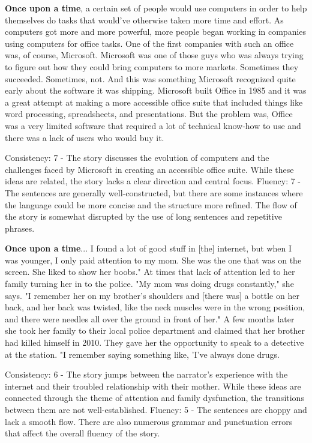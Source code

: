 \documentclass{article}
\begin{document}
\textbf{Once upon a time}, a certain set of people would use computers in order to help themselves do tasks that would've otherwise taken more time and effort. As computers got more and more powerful, more people began working in companies using computers for office tasks. One of the first companies with such an office was, of course, Microsoft. Microsoft was one of those guys who was always trying to figure out how they could bring computers to more markets. Sometimes they succeeded. Sometimes, not. And this was something Microsoft recognized quite early about the software it was shipping. Microsoft built Office in 1985 and it was a great attempt at making a more accessible office suite that included things like word processing, spreadsheets, and presentations. But the problem was, Office was a very limited software that required a lot of technical know-how to use and there was a lack of users who would buy it.

Consistency: 7 - The story discusses the evolution of computers and the challenges faced by Microsoft in creating an accessible office suite. While these ideas are related, the story lacks a clear direction and central focus.
Fluency: 7 - The sentences are generally well-constructed, but there are some instances where the language could be more concise and the structure more refined. The flow of the story is somewhat disrupted by the use of long sentences and repetitive phrases.

\textbf{Once upon a time}... I found a lot of good stuff in [the] internet, but when I was younger, I only paid attention to my mom. She was the one that was on the screen. She liked to show her boobs." At times that lack of attention led to her family turning her in to the police. "My mom was doing drugs constantly," she says. "I remember her on my brother's shoulders and [there was] a bottle on her back, and her back was twisted, like the neck muscles were in the wrong position, and there were needles all over the ground in front of her." A few months later she took her family to their local police department and claimed that her brother had killed himself in 2010. They gave her the opportunity to speak to a detective at the station. "I remember saying something like, 'I've always done drugs.

Consistency: 6 - The story jumps between the narrator's experience with the internet and their troubled relationship with their mother. While these ideas are connected through the theme of attention and family dysfunction, the transitions between them are not well-established.
Fluency: 5 - The sentences are choppy and lack a smooth flow. There are also numerous grammar and punctuation errors that affect the overall fluency of the story.
\end{document}
